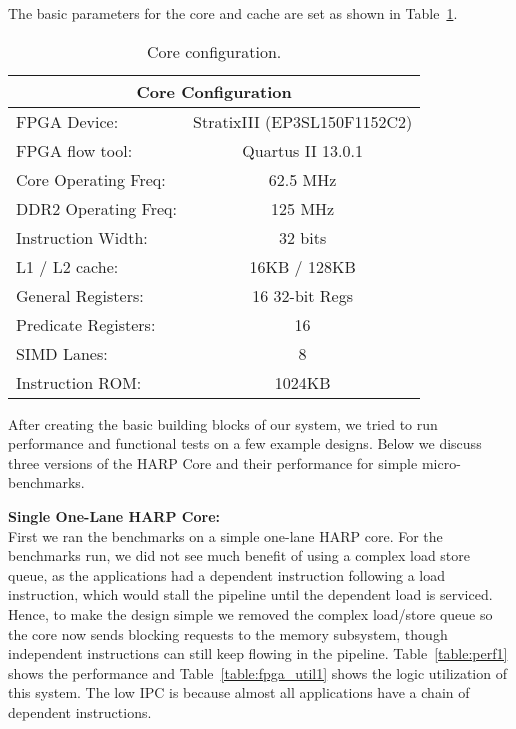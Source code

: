 The basic parameters for the core and cache are set as shown in Table~\ref{table:core_config}.
\begin{table}[!htbp]
  \centering
  \caption{Core configuration.}
  \begin{tabular}{|l|c|}
    \hline
    \multicolumn{2}{|c|}{Core Configuration} \\
    \hline
FPGA Device:				& StratixIII (EP3SL150F1152C2)\\
FPGA flow tool:				& Quartus II 13.0.1\\
Core Operating Freq:			& 62.5 MHz\\
DDR2 Operating Freq:			& 125 MHz\\
Instruction Width:			& 32 bits\\
L1 / L2 cache:				& 16KB / 128KB\\
General Registers:			& 16 32-bit Regs\\
Predicate Registers:			& 16\\
SIMD Lanes:				& 8\\
Instruction ROM:			& 1024KB\\
    \hline
  \end{tabular}
  \label{table:core_config}
\end{table}

After creating the basic building blocks of our system, we tried to run performance and functional tests on a few example designs. Below we discuss three versions of the HARP Core and their performance for simple micro-benchmarks.

\noindent\textbf{Single One-Lane HARP Core:}\\
First we ran the benchmarks on a simple one-lane HARP core. For the benchmarks run, we did not see much benefit of using a complex load store queue, as the applications had a dependent instruction following a load instruction, which would stall the pipeline until the dependent load is serviced. Hence, to make the design simple we removed the complex load/store queue so the core now sends blocking requests to the memory subsystem, though independent instructions can still keep flowing in the pipeline. Table~\ref{table:perf1} shows the performance and Table~\ref{table:fpga_util1} shows the logic utilization of this system. The low IPC is because almost all applications have a chain of dependent instructions.  

